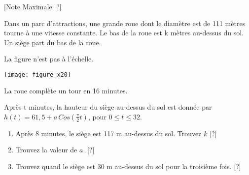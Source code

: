 \begin{question}
  \hspace*{\fill} [Note Maximale: ?]\par
  \noindent Dans un parc d'attractions, une grande roue dont le diamètre est de 111 mètres tourne à une vitesse constante. Le bas de la roue est k mètres au-dessus du sol. Un siège part du bas de la roue.\par
  \medskip
  \begin{center} %
    \noindent La figure n'est pas à l'échelle.\par
    \texttt{[image: figure\_x20]}\par
    \noindent La roue complète un tour en 16 minutes.\par
  \end{center} %

  \noindent Après t minutes, la hauteur du siège au-dessus du sol est donnée par $h(t) = 61,5 + a\,Cos\left(\frac{\pi}{2}t\right)$, pour $0 \le t \le 32$.\par
  \begin{enumerate}[label=(\alph*)]
    \item Après 8 minutes, le siège est 117 m au-dessus du sol. Trouvez $k$\hspace*{\fill} [?]
    \item Trouvez la valeur de $a$.\hspace*{\fill} [?]
    \item Trouvez quand le siège est 30 m au-dessus du sol pour la troisième fois.\hspace*{\fill} [?]
  \end{enumerate}
\end{question}
